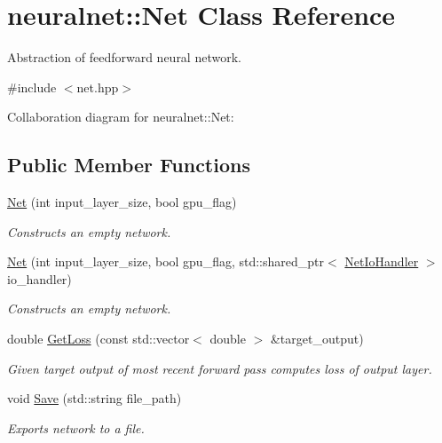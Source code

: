 \hypertarget{classneuralnet_1_1Net}{}\section{neuralnet\+:\+:Net Class Reference}
\label{classneuralnet_1_1Net}


Abstraction of feedforward neural network.  




{\ttfamily \#include $<$net.\+hpp$>$}



Collaboration diagram for neuralnet\+:\+:Net\+:
\subsection*{Public Member Functions}
\begin{DoxyCompactItemize}
\item 
\hyperlink{classneuralnet_1_1Net_ab42c28638b8bf8098a5fe08b3a656c3b}{Net} (int input\+\_\+layer\+\_\+size, bool gpu\+\_\+flag)
\begin{DoxyCompactList}\small\item\em Constructs an empty network. \end{DoxyCompactList}\item 
\hyperlink{classneuralnet_1_1Net_afd6ca6af4811bbb6b2b4ee9de6429cea}{Net} (int input\+\_\+layer\+\_\+size, bool gpu\+\_\+flag, std\+::shared\+\_\+ptr$<$ \hyperlink{classneuralnet_1_1NetIoHandler}{Net\+Io\+Handler} $>$ io\+\_\+handler)
\begin{DoxyCompactList}\small\item\em Constructs an empty network. \end{DoxyCompactList}\item 
double \hyperlink{classneuralnet_1_1Net_a0b2faa9eb2faffdaf01ed8b5318fe069}{Get\+Loss} (const std\+::vector$<$ double $>$ \&target\+\_\+output)
\begin{DoxyCompactList}\small\item\em Given target output of most recent forward pass computes loss of output layer. \end{DoxyCompactList}\item 
\mbox{\label{classneuralnet_1_1Net_af43ecafb444803ac91367825096052d8}} 
void \hyperlink{classneuralnet_1_1Net_af43ecafb444803ac91367825096052d8}{Save} (std\+::string file\+\_\+path)
\begin{DoxyCompactList}\small\item\em Exports network to a file. \end{DoxyCompactList}\item 

\end{DoxyCompactItemize}

